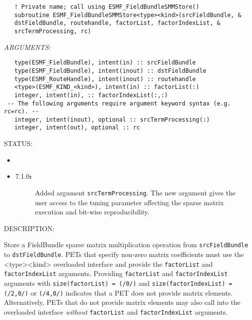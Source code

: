   
\begin{verbatim}   ! Private name; call using ESMF_FieldBundleSMMStore()
   subroutine ESMF_FieldBundleSMMStore<type><kind>(srcFieldBundle, &
   dstFieldBundle, routehandle, factorList, factorIndexList, &
   srcTermProcessing, rc)\end{verbatim}{\em ARGUMENTS:}
\begin{verbatim}   type(ESMF_FieldBundle), intent(in) :: srcFieldBundle
   type(ESMF_FieldBundle), intent(inout) :: dstFieldBundle
   type(ESMF_RouteHandle), intent(inout) :: routehandle
   <type>(ESMF_KIND_<kind>), intent(in) :: factorList(:)
   integer, intent(in), :: factorIndexList(:,:)
 -- The following arguments require argument keyword syntax (e.g. rc=rc). --
   integer, intent(inout), optional :: srcTermProcessing(:)
   integer, intent(out), optional :: rc\end{verbatim}
{\sf STATUS:}
   \begin{itemize}
   \item{}
   \item{}
   \begin{description}
   \item[7.1.0r] Added argument {\tt srcTermProcessing}.
   The new argument gives the user access to the tuning parameter
   affecting the sparse matrix execution and bit-wise
   reproducibility.
   \end{description}
   \end{itemize}
  
{\sf DESCRIPTION:\\ }


  
   \begin{sloppypar}
   Store a FieldBundle sparse matrix multiplication operation from {\tt srcFieldBundle}
   to {\tt dstFieldBundle}. PETs that specify non-zero matrix coefficients must use
   the <type><kind> overloaded interface and provide the {\tt factorList} and
   {\tt factorIndexList} arguments. Providing {\tt factorList} and
   {\tt factorIndexList} arguments with
   {\tt size(factorList) = (/0/)} and
   {\tt size(factorIndexList) = (/2,0/)} or {\tt (/4,0/)} indicates that a
   PET does not provide matrix elements. Alternatively, PETs that do not
   provide matrix elements may also call into the overloaded interface
   {\em without} {\tt factorList} and {\tt factorIndexList} arguments.
   \end{sloppypar}
  
